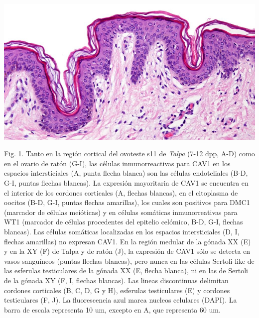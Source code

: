 \documentclass[a0,portrait]{a0poster}
\begin{document}
\begin{multicols*}{2}
\begin{center}
\begin{minipage}[t]{\columnwidth}
\includegraphics[width=\textwidth]{fotos/Fig1poster}

\begin{framed}
Fig. 1. Tanto en la región cortical del ovoteste s11 de \emph{Talpa} (7-12 dpp, A-D) como en el ovario de ratón (G-I), las células inmunorreactivas para CAV1 en los espacios intersticiales (A, punta flecha blanca) son las células endoteliales (B-D, G-I, puntas flechas blancas). La expresión mayoritaria de CAV1 se encuentra en el interior de los cordones corticales (A, flechas blancas), en el citoplasma de oocitos (B-D, G-I, puntas flechas amarillas), los cuales son positivos para DMC1 (marcador de células meióticas) y en células somáticas inmunorreativas para WT1 (marcador de células procedentes del epitelio celómico, B-D, G-I, flechas blancas). Las células somáticas localizadas en los espacios intersticiales (D, I, flechas amarillas) no expresan CAV1. En la región medular de la gónada XX (E) y en la XY (F) de Talpa y de ratón (J), la expresión de CAV1 sólo se detecta en vasos sanguíneos (puntas flechas blancas), pero nunca en las células Sertoli-like de las esferulas testiculares de la gónada XX (E, flecha blanca), ni en las de Sertoli de la gónada XY (F, I, flechas blancas). Las lineas discontinuas delimitan cordones corticales (B, C, D, G y H), esferulas testiculares (E) y cordones testiculares (F, J). La fluorescencia azul marca nucleos celulares (DAPI). La barra de escala representa 10 um, excepto en A, que representa 60 um. 
\end{framed}
\end{minipage}
\end{center}


\end{multicols*}
\end{document}

